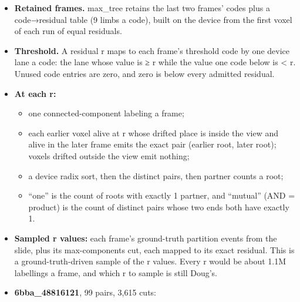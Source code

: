 \begin{itemize}
\item \textbf{Retained frames.} max\_\allowbreak{}tree retains the last two frames' codes plus a code→residual table (9 limbs a code), built on the device from the first voxel of each run of equal residuals.
\item \textbf{Threshold.} A residual r maps to each frame's threshold code by one device lane a code: the lane whose value is ≥ r while the value one code below is < r. Unused code entries are zero, and zero is below every admitted residual.
\item \textbf{At each r:}

\begin{itemize}
\item one connected-component labeling a frame;
\item each earlier voxel alive at r whose drifted place is inside the view and alive in the later frame emits the exact pair (earlier root, later root); voxels drifted outside the view emit nothing;
\item a device radix sort, then the distinct pairs, then partner counts a root;
\item “one” is the count of roots with exactly 1 partner, and “mutual” (AND = product) is the count of distinct pairs whose two ends both have exactly 1.
\end{itemize}
\item \textbf{Sampled r values:} each frame's ground-truth partition events from the slide, plus its max-components cut, each mapped to its exact residual. This is a ground-truth-driven sample of the r values. Every r would be about 1.1M labellings a frame, and which r to sample is still Doug's.
\item \textbf{6bba\_\allowbreak{}48816121}, 99 pairs, 3,615 cuts:


\end{itemize}
